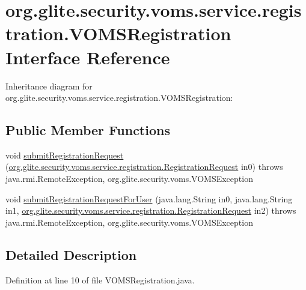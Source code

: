 \hypertarget{interfaceorg_1_1glite_1_1security_1_1voms_1_1service_1_1registration_1_1VOMSRegistration}{
\section{org.glite.security.voms.service.registration.VOMSRegistration Interface Reference}
\label{interfaceorg_1_1glite_1_1security_1_1voms_1_1service_1_1registration_1_1VOMSRegistration}
}


Inheritance diagram for org.glite.security.voms.service.registration.VOMSRegistration:
\subsection*{Public Member Functions}
\begin{DoxyCompactItemize}
\item 
void \hyperlink{interfaceorg_1_1glite_1_1security_1_1voms_1_1service_1_1registration_1_1VOMSRegistration_ab3530210d4ef583ecae5683dd274c363}{submitRegistrationRequest} (\hyperlink{classorg_1_1glite_1_1security_1_1voms_1_1service_1_1registration_1_1RegistrationRequest}{org.glite.security.voms.service.registration.RegistrationRequest} in0)  throws java.rmi.RemoteException, org.glite.security.voms.VOMSException
\item 
void \hyperlink{interfaceorg_1_1glite_1_1security_1_1voms_1_1service_1_1registration_1_1VOMSRegistration_acc10317e3e73477164a5d8db06f37a13}{submitRegistrationRequestForUser} (java.lang.String in0, java.lang.String in1, \hyperlink{classorg_1_1glite_1_1security_1_1voms_1_1service_1_1registration_1_1RegistrationRequest}{org.glite.security.voms.service.registration.RegistrationRequest} in2)  throws java.rmi.RemoteException, org.glite.security.voms.VOMSException
\end{DoxyCompactItemize}


\subsection{Detailed Description}


Definition at line 10 of file VOMSRegistration.java.



